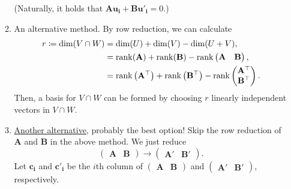 \documentclass[../Notes.tex]{subfiles}
\begin{document}
\begin{stbox}{}
\begin{itemize}
\begin{enumerate}
            (Naturally, it holds that \(\mathbf{A}\mathbf{u_i}+\mathbf{B}\mathbf{u'_i}=0\).)
            \item An alternative method. By row reduction, we can calculate
            \begin{align*}
                r\coloneq\dim(V\cap W)&=\dim(U)+\dim(V)-\dim(U+V),\\
                &=\operatorname{rank}(\mathbf{A})+\operatorname{rank}(\mathbf{B})-\operatorname{rank}
                \begin{pmatrix}
                    \mathbf{A}&\mathbf{B}
                \end{pmatrix},\\
                &=\operatorname{rank}\left(\mathbf{A}^\top\right)+\operatorname{rank}\left(\mathbf{B}^\top\right)-\operatorname{rank}
                \begin{pmatrix}
                    \mathbf{A}^\top\\
                    \mathbf{B}^\top
                \end{pmatrix}.
            \end{align*}
            Then, a basis for \(V\cap W\) can be formed by choosing \(r\) linearly independent vectors in \(V\cap W\). 
            \item \href{https://math.stackexchange.com/a/802878}{Another alternative}, probably the best option! Skip the row reduction of \(\mathbf{A}\) and \(\mathbf{B}\) in the above method. We just reduce
        \[\begin{pmatrix}
            \mathbf{A}&\mathbf{B}
        \end{pmatrix}\to
        \begin{pmatrix}
            \mathbf{A'}&\mathbf{B'}
        \end{pmatrix}.\]
        Let \(\mathbf{c_i}\) and \(\mathbf{c'_i}\) be the \(i\)th column of 
        \(\begin{pmatrix}
            \mathbf{A}&\mathbf{B}
        \end{pmatrix}\) and
        \(\begin{pmatrix}
            \mathbf{A'}&\mathbf{B'}
        \end{pmatrix}\), respectively.

\end{enumerate}
\end{itemize}
\end{stbox}
\end{document}
